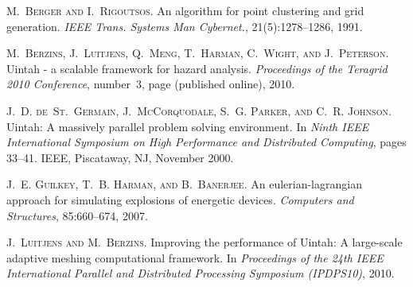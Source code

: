 
\begin{thebibliography}{10}
\textsc{M.~Berger and I.~Rigoutsos}. {An algorithm for point clustering and grid generation}. {\em IEEE Trans. Systems Man Cybernet.}, 21(5):1278--1286, 1991.

\textsc{M.~Berzins, J.~Luitjens, Q.~Meng, T.~Harman, C.~Wight, and J.~Peterson}. {Uintah - a scalable framework for hazard analysis.} {\em Proceedings of the Teragrid 2010 Conference}, number~3, page (published online), 2010.

\textsc{J.~D. de~St.~Germain, J.~McCorquodale, S.~G. Parker, and C.~R. Johnson}. {{U}intah: {A} massively parallel problem solving environment}. In {\em Ninth {IEEE} International Symposium on High Performance and Distributed Computing}, pages 33--41. {IEEE}, Piscataway, NJ, November 2000.

\textsc{J.~E. Guilkey, T.~B. Harman, and B.~Banerjee}. {An eulerian-lagrangian approach for simulating explosions of energetic devices}. {\em Computers and Structures}, 85:660--674, 2007.
 
\textsc{J.~Luitjens and M.~Berzins}. {Improving the performance of {U}intah: {A} large-scale adaptive meshing computational framework}. In {\em Proceedings of the 24th IEEE International Parallel and Distributed Processing Symposium (IPDPS10)}, 2010. 


\end{thebibliography}
